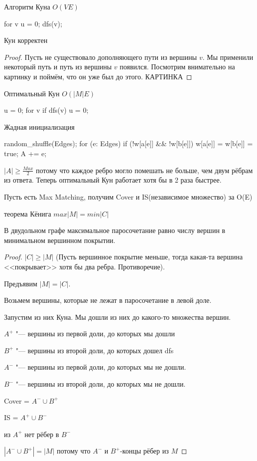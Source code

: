 Алгоритм Куна $O(VE)$
\begin{cppcode}
for v {
	u = 0;
	dfs(v);
}
\end{cppcode}
\begin{theorem}
Кун корректен
\end{theorem}
\begin{proof}
Пусть не существовало дополняющего пути из вершины $v$. Мы применили некоторый путь и путь из вершины $v$ появился. Посмотрим внимательно на картинку и поймём, что он уже был до этого.
КАРТИНКА
\end{proof}
Оптимальный Кун $O(|M|E)$
\begin{cppcode}
u = {0};
for v {
	if dfs(v) {
		u = {0};
	}
}
\end{cppcode}
Жадная инициализация
\begin{cppcode}
random_shuffle(Edges);
for (e: Edges) {
	if (!w[a[e]] && !w[b[e]]) {
		w[a[e]] = w[b[e]] = true;
		A += {e};
	}
}
\end{cppcode}
$|A| \ge \frac{Max}{2}$ потому что каждое ребро могло помешать не больше, чем двум рёбрам из ответа. Теперь оптимальный Кун работает хотя бы в 2 раза быстрее.

Пусть есть Max Matching, получим Cover и IS(независимое множество) за O(E)
\begin{theorem}{теорема Кёнига}
$max |M| = min |C|$

В двудольном графе максимальное паросочетание равно числу вершин в минимальном вершинном покрытии.
\end{theorem}
\begin{proof}
$|C| \ge |M|$ (Пусть вершинное покрытие меньше, тогда какая-та вершина <<покрывает>> хотя бы два ребра. Противоречие).

Предъявим $|M| = |C|$.

Возьмем вершины, которые не лежат в паросочетание в левой доле.

Запустим из них Куна. Мы дошли из них до какого-то множества вершин. 

$A^+$ "--- вершины из первой доли, до которых мы дошли

$B^+$ "--- вершины из второй доли, до которых дошел dfs

$A^-$ "--- вершины из первой доли, до которых мы не дошли.
 
$B^-$ "--- вершины из второй доли, до которых мы не дошли. 

Cover = $A^- \cup B^+$

IS = $A^+ \cup B^-$
\item из $A^+$ нет рёбер в $B^-$
\item $|A^- \cup B^+| = |M|$ потому что $A^-$ и $B^+$-концы рёбер из $M$
\end{proof}
